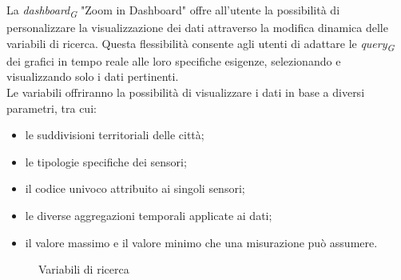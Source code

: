 La \textit{dashboard}\textsubscript{\textit{G}} "Zoom in Dashboard" offre all'utente la possibilità di personalizzare la visualizzazione dei dati attraverso la modifica dinamica delle variabili di ricerca. Questa flessibilità consente agli utenti di adattare le \textit{query}\textsubscript{\textit{G}} dei grafici in tempo reale alle loro specifiche esigenze, selezionando e visualizzando solo i dati pertinenti.\\
Le variabili offriranno la possibilità di visualizzare i dati in base a diversi parametri, tra cui:
\begin{itemize}
    \item le suddivisioni territoriali delle città;
    \item le tipologie specifiche dei sensori;
    \item il codice univoco attribuito ai singoli sensori;
    \item le diverse aggregazioni temporali applicate ai dati;
    \item il valore massimo e il valore minimo che una misurazione può assumere.
\end{itemize}
\begin{figure}[H]
    \centering
    \caption{Variabili di ricerca}
    \label{fig:my_label}
\end{figure}



